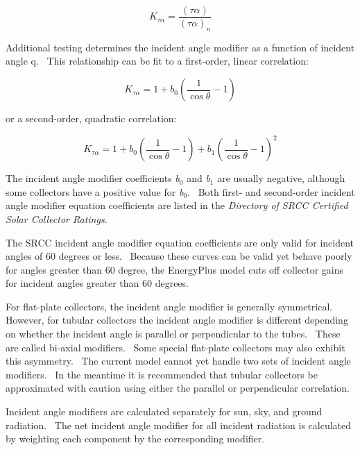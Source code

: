 \begin{equation}
{K_{\tau \alpha }} = \frac{{\left( {\tau \alpha } \right)}}{{{{\left( {\tau \alpha } \right)}_n}}}
\end{equation}

Additional testing determines the incident angle modifier as a function of incident angle q.~ This relationship can be fit to a first-order, linear correlation:

\begin{equation}
{K_{\tau \alpha }} = 1 + {b_0}\left( {\frac{1}{{\cos \theta }} - 1} \right)
\end{equation}

or a second-order, quadratic correlation:

\begin{equation}
{K_{\tau \alpha }} = 1 + {b_0}\left( {\frac{1}{{\cos \theta }} - 1} \right) + {b_1}{\left( {\frac{1}{{\cos \theta }} - 1} \right)^2}
\end{equation}

The incident angle modifier coefficients \emph{b\(_{0}\)} and \emph{b\(_{1}\)} are usually negative, although some collectors have a positive value for \emph{b\(_{0}\)}.~ Both first- and second-order incident angle modifier equation coefficients are listed in the \emph{Directory of SRCC Certified Solar Collector Ratings}.

The SRCC incident angle modifier equation coefficients are only valid for incident angles of 60 degrees or less.~ Because these curves can be valid yet behave poorly for angles greater than 60 degree, the EnergyPlus model cuts off collector gains for incident angles greater than 60 degrees.

For flat-plate collectors, the incident angle modifier is generally symmetrical.~ However, for tubular collectors the incident angle modifier is different depending on whether the incident angle is parallel or perpendicular to the tubes.~ These are called bi-axial modifiers.~ Some special flat-plate collectors may also exhibit this asymmetry.~ The current model cannot yet handle two sets of incident angle modifiers.~ In the meantime it is recommended that tubular collectors be approximated with caution using either the parallel or perpendicular correlation.

Incident angle modifiers are calculated separately for sun, sky, and ground radiation.~ The net incident angle modifier for all incident radiation is calculated by weighting each component by the corresponding modifier.

